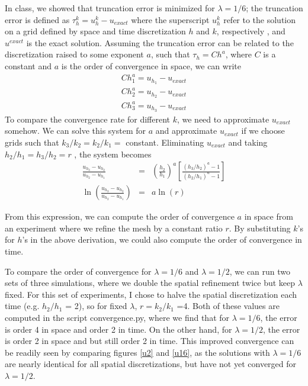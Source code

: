 \documentclass[11pt]{amsart}
\begin{document}
In class, we showed that truncation error is minimized for $\lambda = 1/6$;  the truncation error is defined as $\tau^k_h = u^{k}_h - u_{exact}$ where the superscript $u_h^k$ refer to the solution on a grid defined by space and  time discretization $h$ and $k$, respectively , and $u^{exact}$ is the exact solution. Assuming the truncation error can be related to the discretization raised to some exponent $a$, such that $\tau_h = Ch^a$, where $C$ is a constant and $a$ is the order of convergence in space, we can write  
\begin{eqnarray} 
Ch_1^a = u_{h_1} - u_{exact}\\
Ch_2^a= u_{h_2} - u_{exact}\\
Ch_3^a = u_{h_3} - u_{exact}
\end{eqnarray} 
To compare the convergence rate for different $k$, we need to approximate $u_{exact}$ somehow. We can solve this system for $a$ and approximate $u_{exact}$ if we choose grids such that $k_3/k_2 = k_2/k_1 =$ constant. Eliminating $u_{exact}$ and taking $h_2/h_1 = h_3/h_2 = r$ , the system becomes
\begin{eqnarray} 
\frac{u_{h_3}-u_{h_2}}{u_{h_2}-u_{h_1}} &=& \left(\frac{h_2}{h_1}\right)^a \left[\frac{(h_3/h_2)^a -1}{(h_2/h_1)^a-1}\right]\\
\ln\left( \frac{u_{h_3}-u_{h_2}}{u_{h_2}-u_{h_1}}\right) &=&  a \ln \left(r\right)
\end{eqnarray} 

From this expression, we can compute the order of convergence $a$ in space from an experiment where we refine the mesh by a constant ratio $r$. By substituting $k$'s for $h$'s in the above derivation, we could also compute the order of convergence in time.  

To compare the order of convergence for $\lambda = 1/6$ and $\lambda = 1/2$, we can run two sets of  three simulations, where we double the spatial refinement twice but keep $ \lambda$ fixed. 
For this set of experiments, I chose to halve the spatial discretization each time (e.g. $h_2/h_1$ = 2), so for fixed $\lambda$,  $r =k_2/k_1$ =4. Both of these values are computed in the script convergence.py, where we find that for $\lambda = 1/6$, the error is order 4 in space and order 2 in time. On the other hand, for $\lambda =1/2$,   the error is order 2 in space and  but still order 2 in time. This improved convergence can be readily seen by comparing figures \ref{u2} and \ref{u16}, as the solutions with $\lambda =1/6$ are nearly identical for all spatial discretizations, but have not yet converged for $\lambda = 1/2$.
\end{document}
